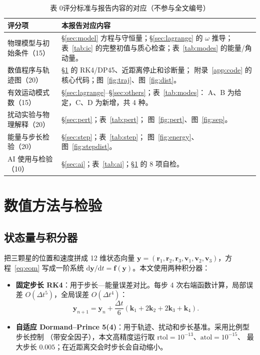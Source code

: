 \documentclass[UTF8,fontset=windows,11pt,a4paper]{ctexart}
\newcommand{\vect}[1]{\mathbf{#1}}
\newcommand{\dd}{\mathrm{d}}
\begin{document}
\begin{table}[H]
\centering\small
\caption*{表 0\quad 评分标准与报告内容的对应（不参与全文编号）}
\begin{tabular}{@{}p{3.6cm}p{11.2cm}@{}}
\toprule
评分项 & 本报告对应内容\\
\midrule
物理模型与初始条件（15） & \S\ref{sec:model} 方程与守恒量；\S\ref{sec:lagrange} 的 $\omega$ 推导；
表~\ref{tab:ic} 的完整初值与质心检查；表~\ref{tab:modes} 的能量/角动量。\\
数值程序与轨迹图（20） & \S\ref{sec:num} 的 RK4/DP45、近距离停止和诊断量；
附录~\ref{app:code} 的核心代码；图~\ref{fig:traj}、图~\ref{fig:dist}。\\
有效运动模式数（15） & \S\ref{sec:lagrange}--\S\ref{sec:others}；表~\ref{tab:modes}：
A、B 为给定，C、D 为新增，共 4 种。\\
扰动实验与物理解释（20） & \S\ref{sec:pert}；表~\ref{tab:pert}；
图~\ref{fig:pert}、图~\ref{fig:sep}。\\
能量与步长检验（20） & \S\ref{sec:step}；表~\ref{tab:step}；
图~\ref{fig:energy}、图~\ref{fig:stepdist}。\\
AI 使用与检验（10） & \S\ref{sec:ai}；表~\ref{tab:ai}；\S\ref{sec:num} 的 8 项自检。\\
\bottomrule
\end{tabular}
\end{table}

\section{数值方法与检验}\label{sec:num}

\subsection{状态量与积分器}
把三颗星的位置和速度拼成 12 维状态向量
$\vect y=(\vect r_1,\vect r_2,\vect r_3,\vect v_1,\vect v_2,\vect v_3)$，方程~\eqref{eq:eom}
写成一阶系统 $\dd\vect y/\dd t=\vect f(\vect y)$。本文使用两种积分器：

\begin{itemize}[leftmargin=2em,itemsep=2pt]
\item \textbf{固定步长 RK4}：用于步长—能量误差对比。每步 4 次右端函数计算，局部误差
$O(\Delta t^5)$，全局误差 $O(\Delta t^4)$：
\begin{equation}\label{eq:rk4}
\vect y_{n+1}=\vect y_n+\frac{\Delta t}{6}\left(\vect k_1+2\vect k_2+2\vect k_3+\vect k_4\right).
\end{equation}
\item \textbf{自适应 Dormand--Prince 5(4)}：用于轨迹、扰动和步长基准。采用比例型步长控制
（带安全因子），本文高精度运行取 $\mathrm{rtol}=10^{-13}$、$\mathrm{atol}=10^{-15}$、
最大步长 $0.005$；在近距离交会时步长会自动缩小。
\end{itemize}
\end{document}
